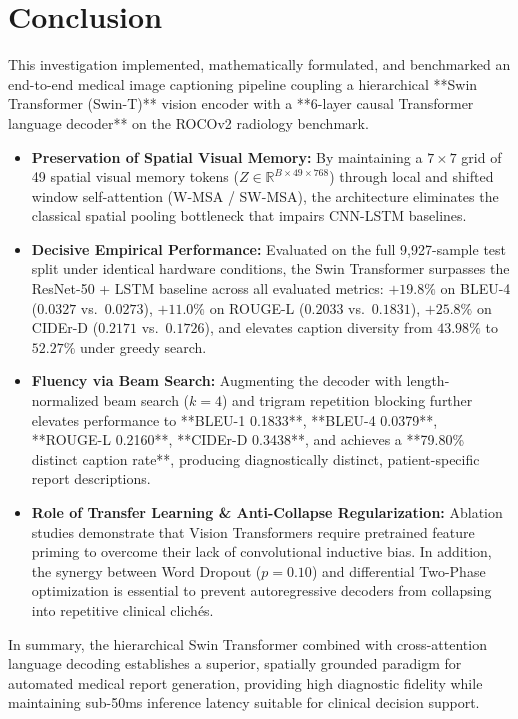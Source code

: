 \chapter{Conclusion}

This investigation implemented, mathematically formulated, and benchmarked an end-to-end medical image captioning pipeline coupling a hierarchical **Swin Transformer (Swin-T)** vision encoder with a **6-layer causal Transformer language decoder** on the ROCOv2 radiology benchmark.

\begin{itemize}
\item \textbf{Preservation of Spatial Visual Memory:} By maintaining a $7 \times 7$ grid of 49 spatial visual memory tokens ($Z \in \mathbb{R}^{B \times 49 \times 768}$) through local and shifted window self-attention (W-MSA / SW-MSA), the architecture eliminates the classical spatial pooling bottleneck that impairs CNN-LSTM baselines.
\item \textbf{Decisive Empirical Performance:} Evaluated on the full 9,927-sample test split under identical hardware conditions, the Swin Transformer surpasses the ResNet-50 + LSTM baseline across all evaluated metrics: $+19.8\%$ on BLEU-4 ($0.0327$ vs.\ $0.0273$), $+11.0\%$ on ROUGE-L ($0.2033$ vs.\ $0.1831$), $+25.8\%$ on CIDEr-D ($0.2171$ vs.\ $0.1726$), and elevates caption diversity from $43.98\%$ to $52.27\%$ under greedy search.
\item \textbf{Fluency via Beam Search:} Augmenting the decoder with length-normalized beam search ($k=4$) and trigram repetition blocking further elevates performance to **BLEU-1 0.1833**, **BLEU-4 0.0379**, **ROUGE-L 0.2160**, **CIDEr-D 0.3438**, and achieves a **79.80\% distinct caption rate**, producing diagnostically distinct, patient-specific report descriptions.
\item \textbf{Role of Transfer Learning \& Anti-Collapse Regularization:} Ablation studies demonstrate that Vision Transformers require pretrained feature priming to overcome their lack of convolutional inductive bias. In addition, the synergy between Word Dropout ($p=0.10$) and differential Two-Phase optimization is essential to prevent autoregressive decoders from collapsing into repetitive clinical clich\'{e}s.
\end{itemize}

In summary, the hierarchical Swin Transformer combined with cross-attention language decoding establishes a superior, spatially grounded paradigm for automated medical report generation, providing high diagnostic fidelity while maintaining sub-50ms inference latency suitable for clinical decision support.
